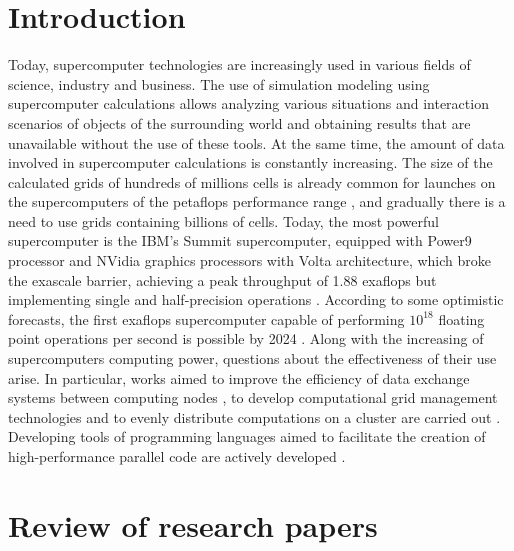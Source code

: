 \documentclass[
11pt,%
tightenlines,%
twoside,%
onecolumn,%
nofloats,%
nobibnotes,%
nofootinbib,%
superscriptaddress,%
noshowpacs,%
centertags]%
{revtex4}
\begin{document}
\maketitle


\section{Introduction}

Today, supercomputer technologies are increasingly used in various fields of science, industry and business. 
The use of simulation modeling using supercomputer calculations allows analyzing various situations and interaction scenarios of objects of the surrounding world and obtaining results that are unavailable without the use of these tools. 
At the same time, the amount of data involved in supercomputer calculations is constantly increasing. 
The size of the calculated grids of hundreds of millions cells is already common for launches on the supercomputers of the petaflops performance range \cite{Rettinger,Krappel}, and gradually there is a need to use grids containing billions of cells. 
Today, the most powerful supercomputer is the IBM's Summit supercomputer, equipped with Power9 processor and NVidia graphics processors with Volta architecture, which broke the exascale barrier, achieving a peak throughput of 1.88 exaflops but implementing single and half-precision operations \cite{Hines}.
According to some optimistic forecasts, the first exaflops supercomputer capable of performing $ 10^{18} $ floating point operations per second is possible by 2024 \cite{Markidis}.
Along with the increasing of supercomputers computing power, questions about the effectiveness of their use arise. 
In particular, works aimed to improve the efficiency of data exchange systems between computing nodes \cite{Klenk,Abduljabbar}, to develop computational grid management technologies and to evenly distribute computations on a cluster are carried out \cite{Rybakov,Van,Benderskiy}. 
Developing tools of programming languages aimed to facilitate the creation of high-performance parallel code are actively developed \cite{Heller,Roganov}.

\section*{Review of research papers}
\end{document}
